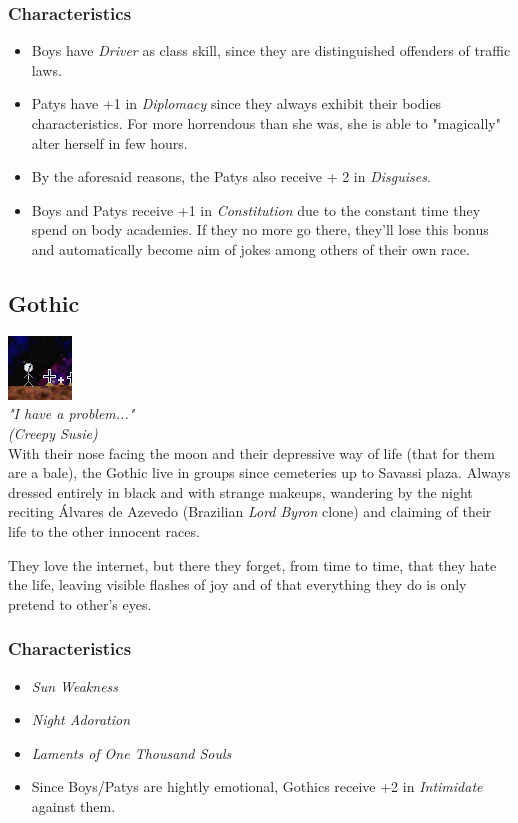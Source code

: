 \documentclass[ letterpaper,12pt]{article}
\begin{document}
\subsubsection{Characteristics}
\begin{itemize}
\item{Boys have {\it Driver} as class skill, since they are distinguished offenders of traffic laws.}
\item{Patys have +1 in {\it Diplomacy} since they always exhibit their bodies characteristics. For more horrendous than she was, she is able to "magically" alter herself in few hours.}
\item{By the aforesaid reasons, the Patys also receive + 2 in {\it Disguises}.}
\item{Boys and Patys receive +1 in {\it Constitution} due to the constant time they spend on body academies. If they no more go there, they'll lose this bonus and automatically become aim of jokes among others of their own race.}
\end{itemize}

\subsection{Gothic}
\includegraphics{../data/races/Img/gotico.png}\\
{\it "I have a problem..."
\\(Creepy Susie)}\\

With their nose facing the moon and their depressive way of life (that for them
are a bale), the Gothic live in groups since cemeteries up to Savassi plaza.
Always dressed entirely in black and with strange makeups, wandering by the
night reciting Álvares de Azevedo (Brazilian {\it Lord Byron} clone) and
claiming of their life to the other innocent races. 

They love the internet, but there they forget, from time to time, that they
hate the life, leaving visible flashes of joy and of that everything they do is
only pretend to other's eyes. 

\subsubsection{Characteristics}
\begin{itemize}
\item{\it Sun Weakness}
\item{\it Night Adoration}
\item{\it Laments of One Thousand Souls}
\item{Since Boys/Patys are hightly emotional, Gothics receive +2 in {\it Intimidate} against them.}
\end{itemize}
\end{document}

